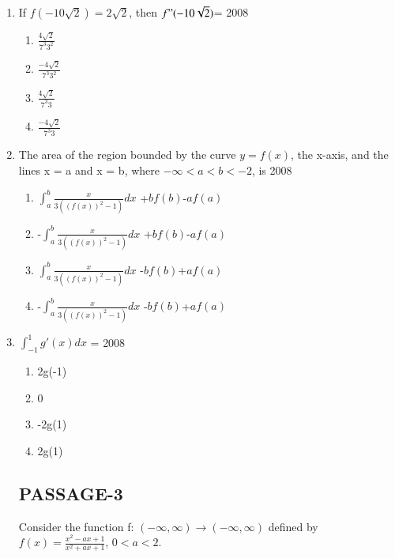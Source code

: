 \documentclass[journal,12pt,twocolumn]{IEEEtran}
\theoremstyle{remark}
\begin{document}
\begin{enumerate}
\item If $f(-10\sqrt{2})=2\sqrt{2}$, then $f"(-10\sqrt{2})$=
\hfill{2008}
\begin{enumerate}
    \item $\frac{4\sqrt{2}}{7^3 3^2}$
    \item $\frac{-4\sqrt{2}}{7^3 3^2}$ 
     \item $\frac{4\sqrt{2}}{7^3 3}$  
     \item $\frac{-4\sqrt{2}}{7^3 3}$ 
\end{enumerate}
\item The area of the region bounded by the curve $y=f(x)$, the x-axis, and the lines x = a and x = b, where $-\infty <a<b<-2$, is
\hfill{2008}
\begin{enumerate}
    \item $\int_a^b\frac{x}{3((f(x))^2-1)}dx$ +$bf(b)$-$af(a)$ 
    \item -$\int_a^b\frac{x}{3((f(x))^2-1)}dx$ +$bf(b)$-$af(a)$
    \item $\int_a^b\frac{x}{3((f(x))^2-1)}dx$ -$bf(b)$+$af(a)$ 
    \item -$\int_a^b\frac{x}{3((f(x))^2-1)}dx$ -$bf(b)$+$af(a)$ 
\end{enumerate}
\item $\int_ {-1}^{1} g'(x)dx$ =
\hfill{2008}
\begin{enumerate}
    \item 2g(-1)
    \item 0
    \item -2g(1)
    \item 2g(1)
\end{enumerate}
\subsection{PASSAGE-3}
Consider the function f: $(-\infty,\infty)\rightarrow(-\infty,\infty)$ defined by $f(x)=\frac{x^2 -ax+1}{x^2+ax+1}$, $ 0<a<2.$


\end{enumerate}
\end{document}
